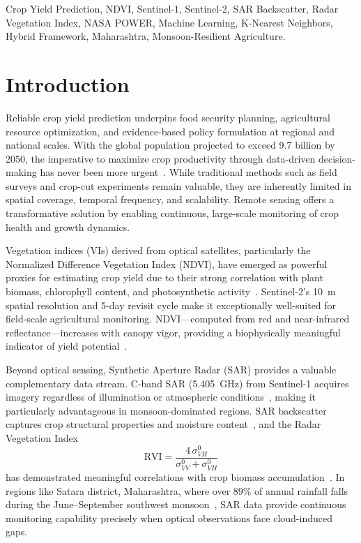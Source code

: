 \documentclass[conference]{IEEEtran}
\begin{document}
\begin{IEEEkeywords}
Crop Yield Prediction, NDVI, Sentinel-1, Sentinel-2, SAR Backscatter, Radar
Vegetation Index, NASA POWER, Machine Learning, K-Nearest Neighbors,
Hybrid Framework, Maharashtra, Monsoon-Resilient Agriculture.
\end{IEEEkeywords}

\section{Introduction}

Reliable crop yield prediction underpins food security planning, agricultural
resource optimization, and evidence-based policy formulation at regional and
national scales. With the global population projected to exceed 9.7 billion
by 2050, the imperative to maximize crop productivity through data-driven
decision-making has never been more urgent~\cite{narimani2026}. While
traditional methods such as field surveys and crop-cut experiments remain
valuable, they are inherently limited in spatial coverage, temporal frequency,
and scalability. Remote sensing offers a transformative solution by enabling
continuous, large-scale monitoring of crop health and growth dynamics.

Vegetation indices (VIs) derived from optical satellites, particularly the
Normalized Difference Vegetation Index (NDVI), have emerged as powerful
proxies for estimating crop yield due to their strong correlation with plant
biomass, chlorophyll content, and photosynthetic
activity~\cite{narimani2026,kameoka2025}. Sentinel-2's \SI{10}{\metre}
spatial resolution and 5-day revisit cycle make it exceptionally well-suited
for field-scale agricultural monitoring. NDVI---computed from red and
near-infrared reflectance---increases with canopy vigor, providing a
biophysically meaningful indicator of yield potential~\cite{kameoka2025}.

Beyond optical sensing, Synthetic Aperture Radar (SAR) provides a valuable
complementary data stream. C-band SAR (\SI{5.405}{\giga\hertz}) from
Sentinel-1 acquires imagery regardless of illumination or atmospheric
conditions~\cite{esa2022}, making it particularly advantageous in
monsoon-dominated regions. SAR backscatter captures crop structural properties
and moisture content~\cite{veloso2017}, and the Radar Vegetation Index
\begin{equation}
\text{RVI} = \frac{4\,\sigma^0_{VH}}{\sigma^0_{VV} + \sigma^0_{VH}}
\label{eq:rvi_intro}
\end{equation}
has demonstrated meaningful correlations with crop biomass
accumulation~\cite{mandal2020}. In regions like Satara district, Maharashtra,
where over 89\% of annual rainfall falls during the June--September southwest
monsoon~\cite{karande2016}, SAR data provide continuous monitoring capability
precisely when optical observations face cloud-induced gaps.
\end{document}
